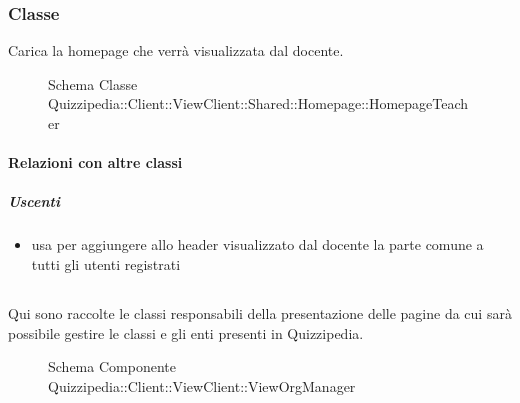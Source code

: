 \subsubsection{Classe }
Carica la homepage che verrà visualizzata dal docente.
\begin{figure}[H]
\centering
\noindent{}
\caption[Schema Classe HomepageTeacher]{Schema Classe Quizzipedia::Client::ViewClient::Shared::Homepage::HomepageTeacher}
\end{figure}
\paragraph{Relazioni con altre classi}
\subparagraph{Uscenti}
\begin{itemize}
\item usa  per aggiungere allo header visualizzato dal docente la parte comune a tutti gli utenti registrati
\end{itemize}
\subsection{}
Qui sono raccolte le classi responsabili della presentazione delle pagine da cui sarà possibile gestire le classi e gli enti presenti in Quizzipedia.
\begin{figure}[H]
\centering
\noindent{}
\caption[Schema Componente Quizzipedia::Client::ViewClient::ViewOrgManager]{Schema Componente Quizzipedia::Client::ViewClient::ViewOrgManager}
\end{figure}
